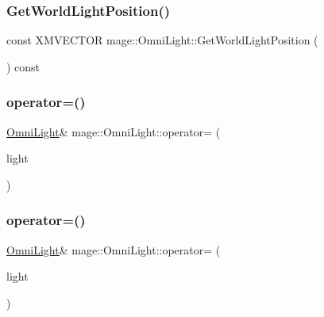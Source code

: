 \hypertarget{classmage_1_1_omni_light_aac84b4cd5f3cc3b4cb162b03c8eddd8f}{}\label{classmage_1_1_omni_light_aac84b4cd5f3cc3b4cb162b03c8eddd8f} 
\subsubsection{\texorpdfstring{Get\+World\+Light\+Position()}{GetWorldLightPosition()}}
{\footnotesize\ttfamily const X\+M\+V\+E\+C\+T\+OR mage\+::\+Omni\+Light\+::\+Get\+World\+Light\+Position (\begin{DoxyParamCaption}{ }\end{DoxyParamCaption}) const}

\hypertarget{classmage_1_1_omni_light_a229f887994607b5b2813af223b0de302}{}\label{classmage_1_1_omni_light_a229f887994607b5b2813af223b0de302} 
\subsubsection{\texorpdfstring{operator=()}{operator=()}\hspace{0.1cm}{\footnotesize\ttfamily [1/2]}}
{\footnotesize\ttfamily \hyperlink{classmage_1_1_omni_light}{Omni\+Light}\& mage\+::\+Omni\+Light\+::operator= (\begin{DoxyParamCaption}\item[{const \hyperlink{classmage_1_1_omni_light}{Omni\+Light} \&}]{light }\end{DoxyParamCaption})\hspace{0.3cm}{\ttfamily [default]}}

\hypertarget{classmage_1_1_omni_light_ab753e7311449d30dac4dfee1f8498e92}{}\label{classmage_1_1_omni_light_ab753e7311449d30dac4dfee1f8498e92} 
\subsubsection{\texorpdfstring{operator=()}{operator=()}\hspace{0.1cm}{\footnotesize\ttfamily [2/2]}}
{\footnotesize\ttfamily \hyperlink{classmage_1_1_omni_light}{Omni\+Light}\& mage\+::\+Omni\+Light\+::operator= (\begin{DoxyParamCaption}\item[{\hyperlink{classmage_1_1_omni_light}{Omni\+Light} \&\&}]{light }\end{DoxyParamCaption})\hspace{0.3cm}{\ttfamily [default]}}

